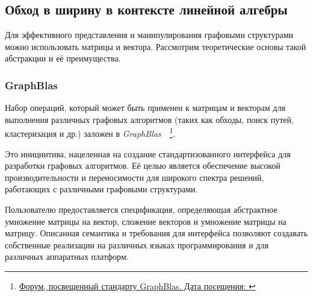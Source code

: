 \subsection{Обход в ширину в контексте линейной алгебры}
Для эффективного представления и манипулирования графовыми структурами можно использовать матрицы и вектора. Рассмотрим теоретические основы такой  абстракции и её преимущества.



\subsubsection*{GraphBlas}
Набор операций, который может быть применен к матрицам и векторам для выполнения различных графовых алгоритмов (таких как обходы, поиск путей, кластеризация и др.) заложен в \textit{GraphBlas}~\cite{gb_math}~\footnote{\href{https://graphblas.org/}{Форум, посвещенный стандарту GraphBlas. Дата посещения: }}.

Это инициитива, нацеленная на создание стандартизованного интерфейса для разработки графовых алгоритмов. Её целью является обеспечение высокой производительности и переносимости для широкого спектра решений, работающих с различными графовыми структурами.

Пользователю предоставляется спецификация, определяющая абстрактное умножение матрицы на вектор, сложение векторов и умножение матрицы на матрицу. Описанная семантика и требования для интерфейса позволяют создавать собственные реализации на различных языках программирования и для различных аппаратных платформ. 



